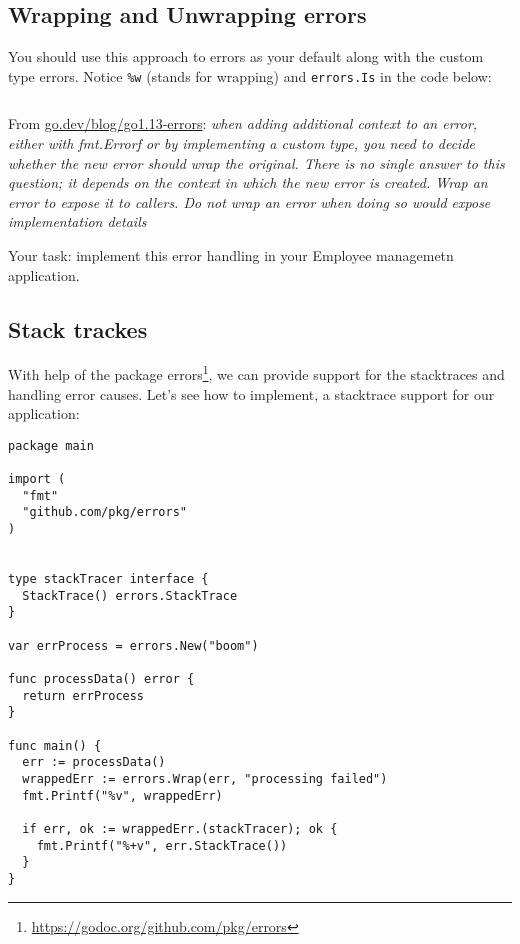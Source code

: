 \documentclass[11pt, letterpaper]{article}
\begin{document}
\pagebreak

\subsection{Wrapping and Unwrapping errors}

You should use this approach to errors as your default along with the custom type errors. Notice \verb|%w| (stands for wrapping) and \texttt{errors.Is}  in the code below:

\inputminted[frame=single]{go}{examples/wrap_errors/main.go}

From \href{https://go.dev/blog/go1.13-errors}{go.dev/blog/go1.13-errors}: \emph{when adding additional context to an error, either with fmt.Errorf or by implementing a custom type, you need to decide whether the new error should wrap the original. There is no single answer to this question; it depends on the context in which the new error is created. Wrap an error to expose it to callers. Do not wrap an error when doing so would expose implementation details}

\bigskip

Your task: implement this error handling in your Employee managemetn application.

\subsection{Stack trackes}

With help of the package errors\footnote{\href{https://godoc.org/github.com/pkg/errors}{https://godoc.org/github.com/pkg/errors}}, we can provide support for the stacktraces and handling error causes. Let's see how to implement, a stacktrace support for our application: 

\begin{verbatim}
package main

import (
  "fmt"
  "github.com/pkg/errors"
)


type stackTracer interface {
  StackTrace() errors.StackTrace
}

var errProcess = errors.New("boom")

func processData() error {
  return errProcess
}

func main() {
  err := processData()
  wrappedErr := errors.Wrap(err, "processing failed")
  fmt.Printf("%v", wrappedErr)

  if err, ok := wrappedErr.(stackTracer); ok {
    fmt.Printf("%+v", err.StackTrace())
  }
}
\end{verbatim}
\end{document}
